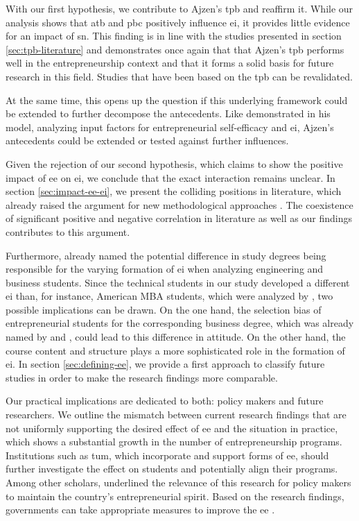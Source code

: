With our first hypothesis, we contribute to Ajzen's \acl{tpb} and reaffirm it. While our analysis shows that \ac{atb} and \ac{pbc} positively influence \ac{ei}, it provides little evidence for an impact of \ac{sn}. This finding is in line with the studies presented in section \ref{sec:tpb-literature} and demonstrates once again that that Ajzen's \ac{tpb} performs well in the entrepreneurship context and that it forms a solid basis for future research in this field. Studies that have been based on the \ac{tpb} can be revalidated. 

At the same time, this opens up the question if this underlying framework could be extended to further decompose the antecedents. Like \citet{zhao2005mediating} demonstrated in his model, analyzing input factors for entrepreneurial self-efficacy and \ac{ei}, Ajzen's antecedents could be extended or tested against further influences.

Given the rejection of our second hypothesis, which claims to show the positive impact of \ac{ee} on \ac{ei}, we conclude that the exact interaction remains unclear. In section \ref{sec:impact-ee-ei}, we present the colliding positions in literature, which already raised the argument for new methodological approaches \citep{von2010effects,lorz2011impact}. The coexistence of significant positive and negative correlation in literature as well as our findings contributes to this argument.

Furthermore, \citet{solesvik2013entrepreneurial} already named the potential difference in study degrees being responsible for the varying formation of \ac{ei} when analyzing engineering and business students. Since the technical students in our study developed a different \ac{ei} than, for instance, American MBA students, which were analyzed by \citet{zhao2005mediating}, two possible implications can be drawn. On the one hand, the selection bias of entrepreneurial students for the corresponding business degree, which was already named by \citet{von2010effects} and \citet{lorz2011impact}, could lead to this difference in attitude. On the other hand, the course content and structure plays a more sophisticated role in the formation of \ac{ei}. In section \ref{sec:defining-ee}, we provide a first approach to classify future studies in order to make the research findings more comparable.

Our practical implications are dedicated to both: policy makers and future researchers. We outline the mismatch between current research findings that are not uniformly supporting the desired effect of \ac{ee} and the situation in practice, which shows a substantial growth in the number of entrepreneurship programs. Institutions such as \ac{tum}, which incorporate and support forms of \ac{ee}, should further investigate the effect on students and potentially align their programs. Among other scholars, \citet{martin2013examining} underlined the relevance of this research for policy makers to maintain the country's entrepreneurial spirit. Based on the research findings, governments can take appropriate measures to improve the \ac{ee} \citep{solesvik2013entrepreneurial}.

